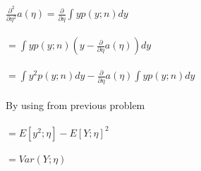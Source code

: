 \newcommand\tab[1][1cm]{\hspace*{#1}}
\begin{answer}
\\ \\
\tab[2.25cm]$\frac{\partial^2}{\partial\eta^2} a(\eta) = \frac{\partial}{\partial\eta}\int yp(y;n)dy$ \\ \\
\tab[3.25cm]$= \int yp(y;n)(y-\frac{\partial}{\partial\eta}a(\eta))dy$ \\ \\
\tab[3.25cm]$= \int y^2p(y;n)dy-\frac{\partial}{\partial\eta}a(\eta)\int yp(y;n)dy$ \\ \\
By using from previous problem\\ \\
\tab[3.25cm]$= E[y^2;\eta] - E[Y;\eta]^2$ \\ \\
\tab[3.25cm]$= Var(Y;\eta) $ \\ \\
\end{answer}
